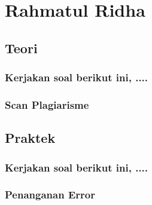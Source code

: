 \section{Rahmatul Ridha}
\subsection{Teori}
\subsubsection{Kerjakan soal berikut ini, ....}
\subsubsection{Scan Plagiarisme}

\subsection{Praktek}
\subsubsection{Kerjakan soal berikut ini, ....}
\subsubsection{Penanganan Error}